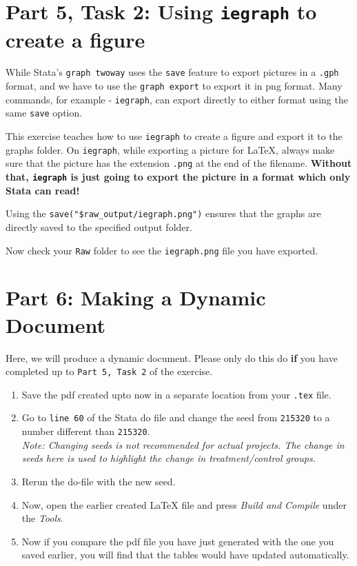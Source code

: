 \documentclass[]{article}
\begin{document}
\section*{Part 5, Task 2: Using \texttt{iegraph} to create a figure}

While Stata's \texttt{graph twoway} uses the \texttt{save} feature to export pictures in a \texttt{.gph} format, and we have to use the \texttt{graph export} to export it in png format. Many commands, for example - \texttt{iegraph}, can export directly to either format using the same \texttt{save} option. 

This exercise teaches how to use \texttt{iegraph} to create a figure and export it to the graphs folder. On \texttt{iegraph}, while exporting a picture for {\LaTeX}, always make sure that the picture has the extension \texttt{.png} at the end of the filename. \textbf{Without that, \texttt{iegraph} is just going to export the picture in a format which only Stata can read!}

Using the \verb|save("$raw_output/iegraph.png")| ensures that the graphs are directly saved to the specified output folder. 

Now check your \texttt{Raw} folder to see the \texttt{iegraph.png} file you have exported.

\section*{Part 6: Making a Dynamic Document }

Here, we will produce a dynamic document. Please only do this do \textbf{if} you have completed up to \texttt{Part 5, Task 2} of the exercise. 

\begin{enumerate}
	\item Save the pdf created upto now in a separate location from your \texttt{.tex} file.
	\item Go to \texttt{line 60} of the Stata do file and change the seed from \texttt{215320} to a number different than \texttt{215320}.\\ \textit{Note: Changing seeds is not recommended for actual projects. The change in seeds here is used to highlight the change in treatment/control groups.}
	\item Rerun the do-file with the new seed.
	\item Now, open the earlier created {\LaTeX} file and press \textit{Build and Compile} under the \textit{Tools}.
	\item Now if you compare the pdf file you have just generated with the one you saved earlier, you will find that the tables would have updated automatically. 
\end{enumerate}
\end{document}
